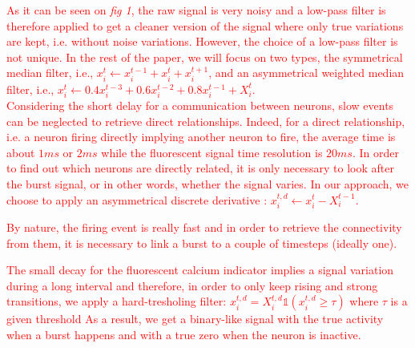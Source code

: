\documentclass[wcp]{jmlr}
\begin{document}

\textcolor{red}{As it can be seen on \textit{fig 1}, the raw signal is very noisy and
a low-pass filter is therefore applied to get a cleaner version of the signal where only
true variations are kept, i.e. without noise variations. However, the choice of a low-pass
filter is not unique. In the rest of the paper, we will focus on two types, the
symmetrical median filter, i.e., $x^t_i \leftarrow x^{t-1}_i + x^{t}_i + x^{t+1}_i$,
and an asymmetrical weighted median filter, i.e.,
$x^t_i \leftarrow 0.4 x^{t-3}_i + 0.6 x^{t-2}_i + 0.8 x^{t-1}_i + X^{t}_i$.}\\


\textcolor{red}{Considering the short delay for a communication between
neurons, slow events can be neglected to retrieve direct relationships.
Indeed, for a direct relationship, i.e. a neuron firing directly implying another
neuron to fire, the average time is about $1ms$ or $2ms$ while the
fluorescent signal time resolution is $20ms$. In order to find out which neurons
are directly related, it is only necessary to look after the burst signal, or
in other words, whether the signal varies. In our approach, we choose to apply
an asymmetrical discrete derivative : $x^{t,d}_{i} \leftarrow x^{t}_i - X^{t-1}_i$.}\\

\textcolor{red}{By nature, the firing event is really fast and in order to
retrieve the connectivity from them, it is necessary to link a burst to a
couple of timesteps (ideally one). 


The small decay for the fluorescent calcium
indicator implies a signal variation during a long interval and therefore, in
order to only keep rising and strong transitions, we apply a hard-tresholing filter:
$x^{t,d}_i = X^{t,d}_i \mathbb{1}(x^{t,d}_i \geq \tau)$ where $\tau$ is a given threshold 
As a result, we get a binary-like signal with the true activity when a burst
happens and with a true zero when the neuron is inactive.}
\end{document}
